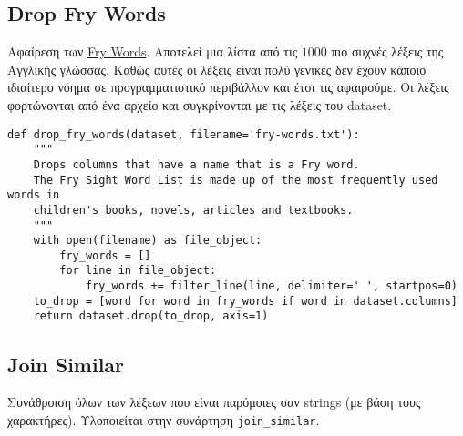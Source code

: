 \subsection{Drop Fry Words}
Αφαίρεση των \href{http://www.k12reader.com/subject/vocabulary/fry-words/}{Fry Words}.
Αποτελεί μια λίστα από τις $1000$ πιο συχνές λέξεις της Αγγλικής γλώσσας.
Καθώς αυτές οι λέξεις είναι πολύ γενικές δεν έχουν κάποιο ιδιαίτερο νόημα σε προγραμματιστικό περιβάλλον και έτσι τις αφαιρούμε.
Οι λέξεις φορτώνονται από ένα αρχείο και συγκρίνονται με τις λέξεις του dataset.
\begin{lstlisting}[captionpos=none, numbers=none, breaklines=true]
def drop_fry_words(dataset, filename='fry-words.txt'):
    """
    Drops columns that have a name that is a Fry word.
    The Fry Sight Word List is made up of the most frequently used words in
    children's books, novels, articles and textbooks.
    """
    with open(filename) as file_object:
        fry_words = []
        for line in file_object:
            fry_words += filter_line(line, delimiter=' ', startpos=0)
    to_drop = [word for word in fry_words if word in dataset.columns]
    return dataset.drop(to_drop, axis=1)
\end{lstlisting}

\subsection{Join Similar}
Συνάθροιση όλων των λέξεων που είναι παρόμοιες σαν strings (με βάση τους χαρακτήρες).
Υλοποιείται στην συνάρτηση \lstinline!join_similar!.

